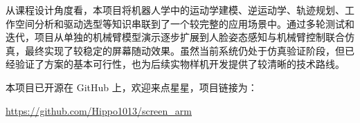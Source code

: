 \documentclass[12pt,a4paper,UTF8]{article}
\begin{document}
从课程设计角度看，本项目将机器人学中的运动学建模、逆运动学、轨迹规划、工作空间分析和驱动选型等知识串联到了一个较完整的应用场景中。通过多轮测试和迭代，项目从单独的机械臂模型演示逐步扩展到人脸姿态感知与机械臂控制联合仿真，最终实现了较稳定的屏幕随动效果。虽然当前系统仍处于仿真验证阶段，但已经验证了方案的基本可行性，也为后续实物样机开发提供了较清晰的技术路线。

本项目已开源在 GitHub 上，欢迎来点星星，项目链接为：
\begin{center}
    \url{https://github.com/Hippo1013/screen_arm}
\end{center}

\clearpage





\end{document}
